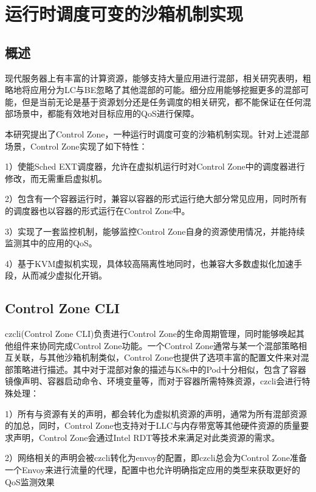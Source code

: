 \chapter{运行时调度可变的沙箱机制实现}\label{chap:control_zone}

\section{概述}


现代服务器上有丰富的计算资源，能够支持大量应用进行混部，相关研究表明，粗略地将应用分为LC与BE忽略了其他混部的可能。细分应用能够挖掘更多的混部可能，但是当前无论是基于资源划分还是任务调度的相关研究，都不能保证在任何混部场景中，都能有效地对目标应用的QoS进行保障。

本研究提出了Control Zone，一种运行时调度可变的沙箱机制实现。针对上述混部场景，Control Zone实现了如下特性：

1）使能Sched EXT调度器，允许在虚拟机运行时对Control Zone中的调度器进行修改，而无需重启虚拟机。

2）包含有一个容器运行时，兼容以容器的形式运行绝大部分常见应用，同时所有的调度器也以容器的形式运行在Control Zone中。

3）实现了一套监控机制，能够监控Control Zone自身的资源使用情况，并能持续监测其中的应用的QoS。

4）基于KVM虚拟机实现，具体较高隔离性地同时，也兼容大多数虚拟化加速手段，从而减少虚拟化开销。

\section{Control Zone CLI}

czcli(Control Zone CLI)负责进行Control Zone的生命周期管理，同时能够唤起其他组件来协同完成Control Zone功能。一个Control Zone通常与某一个混部策略相互关联，与其他沙箱机制类似，Control Zone也提供了选项丰富的配置文件来对混部策略进行描述。其中对于混部对象的描述与K8s中的Pod十分相似，包含了容器镜像声明、容器启动命令、环境变量等，而对于容器所需特殊资源，czcli会进行特殊处理：

1）所有与资源有关的声明，都会转化为虚拟机资源的声明，通常为所有混部资源的加总，同时，Control Zone也支持对于LLC与内存带宽等其他硬件资源的质量要求声明，Control Zone会通过Intel RDT等技术来满足对此类资源的需求。

2）网络相关的声明会被czcli转化为envoy的配置，即czcli总会为Control Zone准备一个Envoy来进行流量的代理，配置中也允许明确指定应用的类型来获取更好的QoS监测效果

